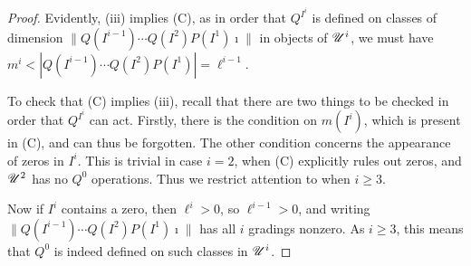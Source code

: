 \documentclass[11pt]{article}
\newcommand{\nontop}[1]{\scrU^{#1}}%
\renewcommand{\Q}{Q}
\newcommand{\SqShift}{\Sq_{+}}
\newcommand{\Sq}{\mathrm{Sq}}
\newcommand{\minDim}{m}
\begin{document}
\begin{CalculatingRepeatedKoszul}
\begin{proof}
Evidently, (iii) implies (C), as in  order that $\Q^{I^i}$ is defined on classes of dimension $\|\Q(I^{i-1})\cdots \Q(I^2)P(I^1)\imath\|$ in objects of $\nontop{i}$, we must have $\minDim^i<|\Q(I^{i-1})\cdots \Q(I^2)P(I^1)|=\ell^{i-1}$.

To check that (C) implies (iii), recall that there are two things to be checked in order that $\Q^{I^i}$ can act. Firstly, there is the condition on $\minDim(I^i)$, which is present in (C), and can thus be forgotten. The other condition concerns the appearance of zeros in $I^i$. This is trivial in case $i=2$, when (C) explicitly rules out zeros, and $\nontop{2}$ has no $\Q^0$ operations. Thus we restrict attention to when $i\geq3$. %

Now if $I^i$ contains a zero, then $\ell^i>0$, so $\ell^{i-1}>0$, and writing $\|\Q(I^{i-1})\cdots \Q(I^2)P(I^1)\imath\|$ has all $i$ gradings nonzero. As $i\geq3$, this means that $\Q^0$ is indeed defined on such classes in $\nontop{i}$.
%
\end{proof}


\end{CalculatingRepeatedKoszul}
\end{document}
